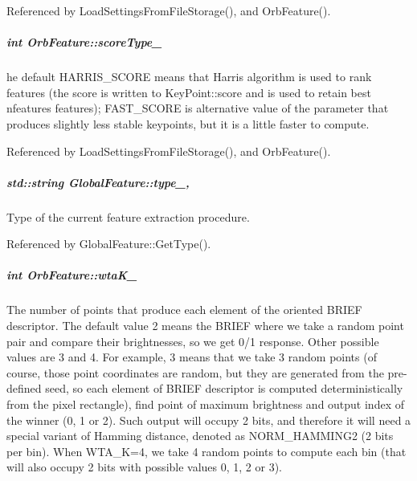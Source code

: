 Referenced by Load\-Settings\-From\-File\-Storage(), and Orb\-Feature().

\hypertarget{group___feature_extractor_a9a4454ef09254b94d88d0b599ad84218}{
\subparagraph[{score\-Type\-\_\-}]{\setlength{\rightskip}{0pt plus 5cm}int Orb\-Feature\-::score\-Type\-\_\-\hspace{0.3cm}{\ttfamily [private]}}}\label{group___feature_extractor_a9a4454ef09254b94d88d0b599ad84218}


he default H\-A\-R\-R\-I\-S\-\_\-\-S\-C\-O\-R\-E means that Harris algorithm is used to rank features (the score is written to Key\-Point\-::score and is used to retain best nfeatures features); F\-A\-S\-T\-\_\-\-S\-C\-O\-R\-E is alternative value of the parameter that produces slightly less stable keypoints, but it is a little faster to compute. 



Referenced by Load\-Settings\-From\-File\-Storage(), and Orb\-Feature().

\hypertarget{group___feature_extractor_ad467857c4bc3d0fe65ba29e3b8f7c796}{
\subparagraph[{type\-\_\-}]{\setlength{\rightskip}{0pt plus 5cm}std\-::string Global\-Feature\-::type\-\_\-\hspace{0.3cm}{\ttfamily [protected]}, {\ttfamily [inherited]}}}\label{group___feature_extractor_ad467857c4bc3d0fe65ba29e3b8f7c796}


Type of the current feature extraction procedure. 



Referenced by Global\-Feature\-::\-Get\-Type().

\hypertarget{group___feature_extractor_a05cc269e6833e1f25c7f7c31928a5ef6}{
\subparagraph[{wta\-K\-\_\-}]{\setlength{\rightskip}{0pt plus 5cm}int Orb\-Feature\-::wta\-K\-\_\-\hspace{0.3cm}{\ttfamily [private]}}}\label{group___feature_extractor_a05cc269e6833e1f25c7f7c31928a5ef6}


The number of points that produce each element of the oriented B\-R\-I\-E\-F descriptor. The default value 2 means the B\-R\-I\-E\-F where we take a random point pair and compare their brightnesses, so we get 0/1 response. Other possible values are 3 and 4. For example, 3 means that we take 3 random points (of course, those point coordinates are random, but they are generated from the pre-\/defined seed, so each element of B\-R\-I\-E\-F descriptor is computed deterministically from the pixel rectangle), find point of maximum brightness and output index of the winner (0, 1 or 2). Such output will occupy 2 bits, and therefore it will need a special variant of Hamming distance, denoted as N\-O\-R\-M\-\_\-\-H\-A\-M\-M\-I\-N\-G2 (2 bits per bin). When W\-T\-A\-\_\-\-K=4, we take 4 random points to compute each bin (that will also occupy 2 bits with possible values 0, 1, 2 or 3). 



